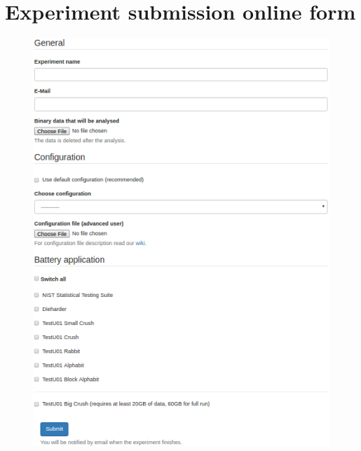 \documentclass[
  digital,  	%
  color,		%
  oneside,   	%
  12pt,
  nocover,
  notable,
  nolof,
  nolot,
]{fithesis3}
\begin{document}
\chapter{Experiment submission online form}
\label{chap:exp_submit_form}

\begin{figure}[h!]
\begin{nomar}
\centering
\includegraphics[width=\textwidth+1.2cm]{figures/submit-experiment-form.png} 
\end{nomar}
\end{figure}
\end{document}
